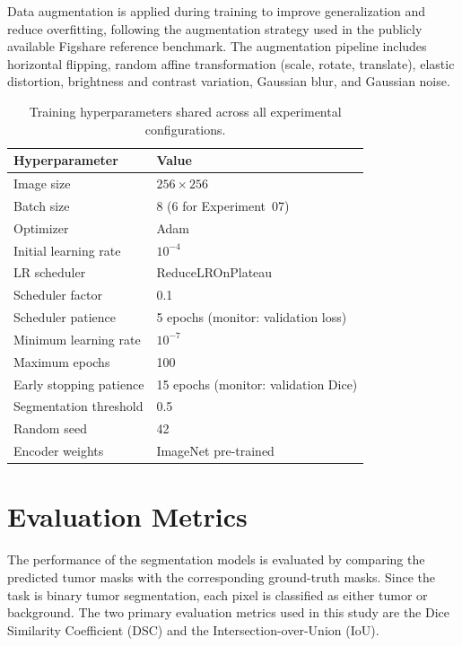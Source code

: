\documentclass[a4paper,12pt]{article}
\begin{document}
Data augmentation is applied during training to improve generalization and reduce overfitting,
following the augmentation strategy used in the publicly available Figshare reference benchmark.
The augmentation pipeline includes horizontal flipping, random affine transformation (scale,
rotate, translate), elastic distortion, brightness and contrast variation, Gaussian blur, and
Gaussian noise.

\begin{table}[htbp]
    \centering
    \caption{Training hyperparameters shared across all experimental configurations.}
    \label{tab:training_params}
    \renewcommand{\arraystretch}{1.3}
    \begin{tabular}{|l|l|}
        \hline
        \textbf{Hyperparameter} & \textbf{Value} \\ \hline
        Image size               & $256 \times 256$ \\ \hline
        Batch size               & 8 \;(6 for Experiment~07) \\ \hline
        Optimizer                & Adam \\ \hline
        Initial learning rate    & $10^{-4}$ \\ \hline
        LR scheduler             & ReduceLROnPlateau \\ \hline
        Scheduler factor         & 0.1 \\ \hline
        Scheduler patience       & 5 epochs (monitor: validation loss) \\ \hline
        Minimum learning rate    & $10^{-7}$ \\ \hline
        Maximum epochs           & 100 \\ \hline
        Early stopping patience  & 15 epochs (monitor: validation Dice) \\ \hline
        Segmentation threshold   & 0.5 \\ \hline
        Random seed              & 42 \\ \hline
        Encoder weights          & ImageNet pre-trained \\ \hline
    \end{tabular}
\end{table}


\section{Evaluation Metrics}
\label{EvaluationMetrics}

The performance of the segmentation models is evaluated by comparing the predicted tumor masks
with the corresponding ground-truth masks. Since the task is binary tumor segmentation, each
pixel is classified as either tumor or background. The two primary evaluation metrics used in
this study are the Dice Similarity Coefficient (DSC) and the Intersection-over-Union (IoU).
\end{document}
